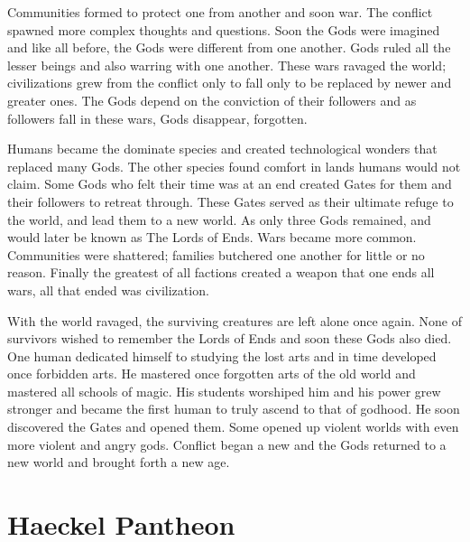 Communities formed to protect one from another and soon war. The conflict spawned more complex thoughts and questions. Soon the Gods were imagined and like all before, the Gods were different from one another. Gods ruled all the lesser beings and also warring with one another. These wars ravaged the world; civilizations grew from the conflict only to fall only to be replaced by newer and greater ones. The Gods depend on the conviction of their followers and as followers fall in these wars, Gods disappear, forgotten.

Humans became the dominate species and created technological wonders that replaced many Gods. The other species found comfort in lands humans would not claim. Some Gods who felt their time was at an end created Gates for them and their followers to retreat through. These Gates served as their ultimate refuge to the world, and lead them to a new world. As only three Gods remained, and would later be known as The Lords of Ends. Wars became more common. Communities were shattered; families butchered one another for little or no reason. Finally the greatest of all factions created a weapon that one ends all wars, all that ended was civilization.

With the world ravaged, the surviving creatures are left alone once again. None of survivors wished to remember the Lords of Ends and soon these Gods also died. One human dedicated himself to studying the lost arts and in time developed once forbidden arts. He mastered once forgotten arts of the old world and mastered all schools of magic. His students worshiped him and his power grew stronger and became the first human to truly ascend to that of godhood. He soon discovered the Gates and opened them. Some opened up violent worlds with even more violent and angry gods. Conflict began a new and the Gods returned to a new world and brought forth a new age.


\newpage
\section{Haeckel Pantheon}

